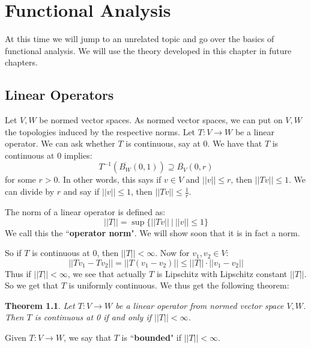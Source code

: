 \documentclass[a4paper,12pt]{report}
\newcommand{\ovl}[1]{\overline{#1}}
\newtheorem{theorem}{Theorem}[section]
\newenvironment{definition}[1][Definition.]{\begin{trivlist}
\item[\hskip \labelsep {\bfseries #1}]}{\end{trivlist}}
\begin{document}
	
	
	\chapter{Functional Analysis}
	At this time we will jump to an unrelated topic and go over the basics of functional analysis. We will use the theory developed in this chapter in future chapters. 
	
	\section{Linear Operators}
	
	Let $V, W$ be normed vector spaces. As normed vector spaces, we can put on $V, W$ the topologies induced by the respective norms. Let $T : V \rightarrow W$ be a linear operator. We can ask whether $T$ is continuous, say at 0. 
	We have that $T$ is continuous at 0 implies:
	\[ T^{-1}(\ovl{B_W}(0, 1)) \supseteq \ovl{B_V}(0, r) \]
	for some $r > 0$. In other words, this says if $v \in V$ and $||v|| \leq r$, then $||Tv|| \leq 1$. We can divide by $r$ and say if $||v|| \leq 1$, then $||Tv|| \leq \frac{1}{r}$. 
	
	\begin{definition}
	The norm of a linear operator is defined as:
	\[ ||T|| = \sup \bigg\{ ||Tv|| ~\big|~ ||v|| \leq 1 \bigg\} \]
	We call this the ``\textbf{operator norm}". We will show soon that it is in fact a norm. 
	\end{definition}
	
	\noindent So if $T$ is continuous at 0, then $||T|| < \infty$. Now for $v_1, v_2 \in V$:
	\[ ||Tv_1 - Tv_2|| = ||T(v_1 - v_2)|| \leq ||T|| \cdot ||v_1 - v_2|| \]
	Thus if $||T|| < \infty$, we see that actually $T$ is Lipschitz with Lipschitz constant $||T||$. So we get that $T$ is uniformly continuous. We thus get the following theorem:
	
	\begin{theorem}
	Let $T : V \rightarrow W$ be a linear operator from normed vector space $V, W$. Then $T$ is continuous at 0 if and only if $||T|| < \infty$. 
	\end{theorem}
	
	\begin{definition}
	Given $T : V \rightarrow W$, we say that $T$ is ``\textbf{bounded}" if $||T|| < \infty$. 
	\end{definition}
	
\end{document}

